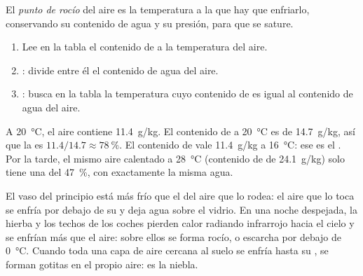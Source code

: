 \begin{definition}\label{def:g10:why-clouds-form:dew-point}
El \emph{punto de rocío} del aire es la
temperatura a la que hay que enfriarlo, conservando su contenido de agua y
su presión, para que se sature.
\end{definition}

\begin{method}\label{met:g10:why-clouds-form:table}
\begin{enumerate}
  \item Lee en la tabla el contenido de  a la temperatura del aire.
  \item {}: divide entre él el contenido de agua del aire.
  \item {}: busca en la tabla la temperatura cuyo contenido de
         es igual al contenido de agua del aire.
\end{enumerate}
\end{method}

\begin{example}\label{ex:g10:why-clouds-form:morning}
A \qty{20}{\degreeCelsius}, el aire contiene \qty{11.4}{g/kg}. El
contenido de  a \qty{20}{\degreeCelsius} es de \qty{14.7}{g/kg},
así que la  es $11.4/14.7 \approx \qty{78}{\percent}$. El
contenido de  vale \qty{11.4}{g/kg} a \qty{16}{\degreeCelsius}:
ese es el . Por la tarde, el mismo aire calentado a
\qty{28}{\degreeCelsius} (contenido de  de \qty{24.1}{g/kg}) solo
tiene una  del \qty{47}{\percent}, con exactamente la misma
agua.
\end{example}

El vaso del principio está más frío que el  del aire que lo
rodea: el aire que lo toca se enfría por debajo de su  y deja
agua sobre el vidrio. En una noche despejada, la hierba y los techos de los
coches pierden calor radiando infrarrojo hacia el cielo y se enfrían más que
el aire: sobre ellos se forma rocío, o escarcha por debajo de
\qty{0}{\degreeCelsius}. Cuando toda una capa de aire cercana al suelo se
enfría hasta su , se forman gotitas en el propio aire: es la
niebla.

